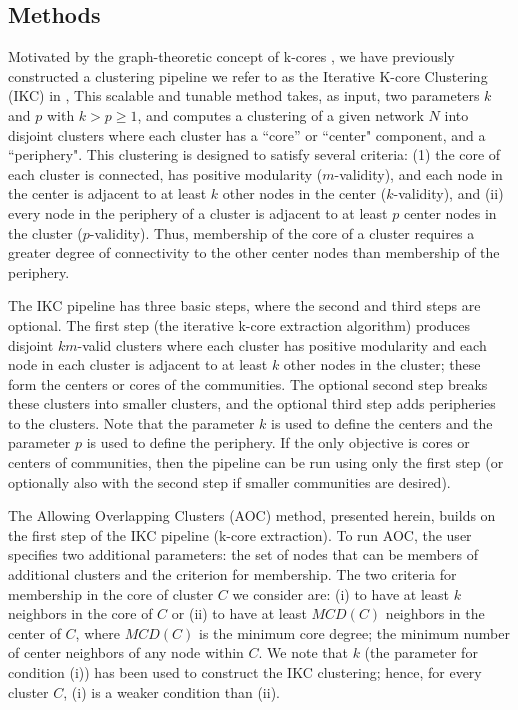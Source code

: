 \documentclass[11pt, oneside]{article}   	%
\begin{document}
\subsection{Methods} Motivated by the graph-theoretic concept of k-cores \citep{Giatsidis2011,malliaros2019}, we have previously constructed a clustering pipeline we refer to as  the Iterative K-core Clustering (IKC) in \cite{Wedell2022}, This scalable and tunable method takes, as input, two parameters $k$ and $p$ with $k > p \geq 1$, and computes a clustering of a given network $N$ into disjoint clusters where each cluster has a ``core'' or ``center" component, and a ``periphery". This clustering is designed to satisfy several criteria: (1) the core of each cluster is connected,  has positive modularity ($m$-validity), and each node in the center  is adjacent to at least $k$ other nodes in the center ($k$-validity), and (ii) every node in the periphery of a cluster is adjacent to at least $p$ center nodes in the cluster ($p$-validity). Thus, membership of the core of a cluster requires a greater degree of connectivity to the other center nodes than membership of the periphery. 

The IKC pipeline has three basic steps, where the second and third steps are optional.  The first step (the iterative k-core extraction algorithm) produces disjoint $km$-valid clusters where each cluster has positive modularity and each node in each cluster is adjacent to at least $k$ other nodes in the cluster; these form the centers or cores of the communities. The optional second step breaks these clusters into smaller clusters, and the optional third step adds peripheries to the clusters.  Note that the parameter $k$ is used to define the centers and the parameter $p$ is used to define the periphery. If the only objective is cores or centers of communities, then the pipeline can be run using only the first step (or optionally also with the second step if smaller communities are desired).

The Allowing Overlapping Clusters (AOC) method, presented herein, builds on the first step of the IKC pipeline (k-core extraction). To run AOC, the user specifies two additional parameters:  
the set of nodes that can be members of  additional clusters and the criterion for membership.  The two criteria for membership in the core of cluster $C$ we consider are: (i) to have at least $k$ neighbors 
in the core of $C$ or (ii) to have at least $MCD(C)$ neighbors in the center of $C$, where $MCD(C)$ is the minimum core degree; the minimum number of center neighbors of any node within $C$. 
We note that $k$ (the parameter for condition (i)) has been used to construct the IKC clustering; hence, for every cluster $C$,  (i) is a weaker condition than (ii).
\end{document}
